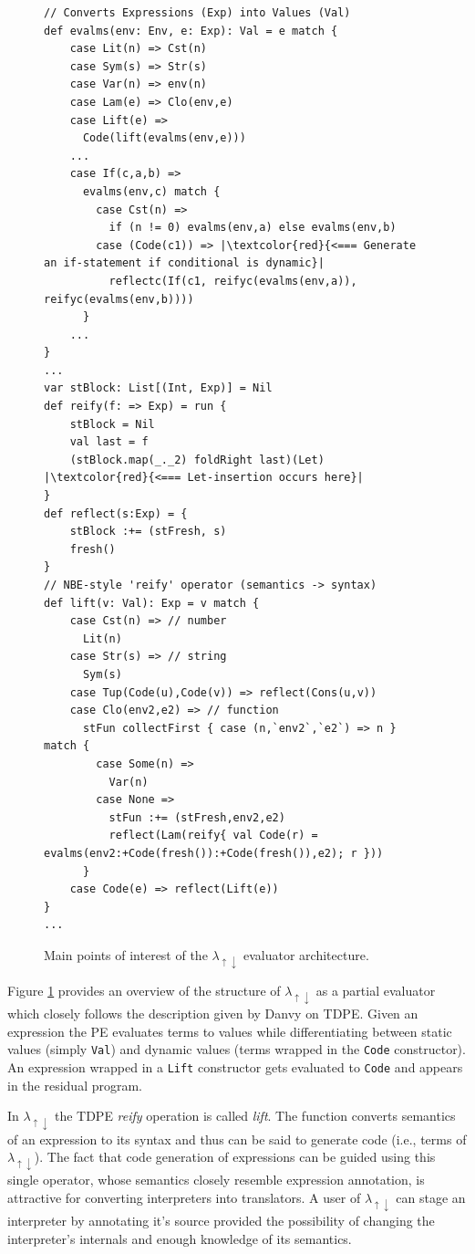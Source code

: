 \documentclass[a4paper,12pt,twoside,openright]{report}
\theoremstyle{definition}
\newcommand{\mslang}{$\lambda_{\uparrow\downarrow}$}
\begin{document}
\begin{figure}
    \centering
    \begin{verbatim}
// Converts Expressions (Exp) into Values (Val)
def evalms(env: Env, e: Exp): Val = e match {
    case Lit(n) => Cst(n)
    case Sym(s) => Str(s)
    case Var(n) => env(n)
    case Lam(e) => Clo(env,e)
    case Lift(e) =>
      Code(lift(evalms(env,e)))
    ...
    case If(c,a,b) =>
      evalms(env,c) match {
        case Cst(n) => 
          if (n != 0) evalms(env,a) else evalms(env,b)
        case (Code(c1)) => |\textcolor{red}{<=== Generate an if-statement if conditional is dynamic}|
          reflectc(If(c1, reifyc(evalms(env,a)), reifyc(evalms(env,b))))
      }
    ...
}
...
var stBlock: List[(Int, Exp)] = Nil
def reify(f: => Exp) = run {
    stBlock = Nil
    val last = f
    (stBlock.map(_._2) foldRight last)(Let) |\textcolor{red}{<=== Let-insertion occurs here}|
}
def reflect(s:Exp) = {
    stBlock :+= (stFresh, s)
    fresh()
}
// NBE-style 'reify' operator (semantics -> syntax)
def lift(v: Val): Exp = v match {
    case Cst(n) => // number
      Lit(n)
    case Str(s) => // string
      Sym(s)
    case Tup(Code(u),Code(v)) => reflect(Cons(u,v))
    case Clo(env2,e2) => // function
      stFun collectFirst { case (n,`env2`,`e2`) => n } match {
        case Some(n) =>
          Var(n)
        case None =>
          stFun :+= (stFresh,env2,e2)
          reflect(Lam(reify{ val Code(r) = evalms(env2:+Code(fresh()):+Code(fresh()),e2); r }))
      }
    case Code(e) => reflect(Lift(e))
}
...
    \end{verbatim}
    \caption{Main points of interest of the \mslang{} evaluator architecture.}
    \label{lst:evalms}
\end{figure}

Figure \ref{lst:evalms} provides an overview of the structure of \mslang{} as a partial evaluator which closely follows the description given by Danvy \cite{danvy1999type} on TDPE. Given an expression the PE evaluates terms to values while differentiating between static values (simply \texttt{Val}) and dynamic values (terms wrapped in the \texttt{Code} constructor). An expression wrapped in a \texttt{Lift} constructor gets evaluated to \texttt{Code} and appears in the residual program. 

In \mslang{} the TDPE \textit{reify} operation is called \textit{lift}. The function converts semantics of an expression to its syntax and thus can be said to generate code (i.e., terms of \mslang). The fact that code generation of expressions can be guided using this single operator, whose semantics closely resemble expression annotation, is attractive for converting interpreters into translators. A user of \mslang{} can stage an interpreter by annotating it's source provided the possibility of changing the interpreter's internals and enough knowledge of its semantics.
\end{document}
